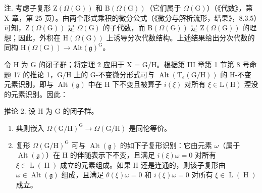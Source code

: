 注. 考虑子复形 \(\mathrm{Z}(\varOmega(\mathrm{G}))\) 和 \(\mathrm{B}(\varOmega(\mathrm{G}))\)（它们属于 \(\varOmega(\mathrm{G})\)）（《代数》，第 X 章，第 25 页）。由两个形式乘积的微分公式（《微分与解析流形，结果》，8.3.5）可知，\(\mathrm{Z}(\varOmega(\mathrm{G}))\) 是 \(\varOmega(\mathrm{G})\) 的子代数，而 \(\mathrm{B}(\varOmega(\mathrm{G}))\) 是 \(\mathrm{Z}(\varOmega(\mathrm{G}))\) 的理想；因此，外积在 \(\mathrm{H}(\varOmega(\mathrm{G}))\) 上诱导分次代数结构。上述结果给出分次代数的同构 \(\mathrm{H}(\varOmega(\mathrm{G})) \to \mathrm{Alt}(\mathfrak{g})^{\mathrm{G}}\)。

令 H 为 G 的闭子群；将定理 2 应用于 X = G/H。根据第 III 章第 1 节第 8 号命题 17 的推论 1，G/H 上的 G-不变微分形式可与 \(\operatorname{Alt}(\mathrm{T}_{e}(\mathrm{G}/\mathrm{H}))\) 的 H-不变元素识别，即与 \(\operatorname{Alt}(\mathfrak{g})\) 中在 H 下不变且被算子 \(i(\xi)\) 对所有 \(\xi \in \mathrm{L}(\mathrm{H})\) 湮没的元素识别。因此：

推论 2. 设 \(\mathrm{H}\) 为 \(\mathrm{G}\) 的闭子群。

\begin{enumerate}
\def\labelenumi{\alph{enumi})}
\item
  典则嵌入 \(\Omega (\mathrm{G / H})^{\mathrm{G}}\to \Omega (\mathrm{G / H})\) 是同伦等价。
\item
  复形 \(\Omega(\mathrm{G}/\mathrm{H})^{\mathrm{G}}\) 可与 \(\operatorname{Alt}(\mathfrak{g})\) 的如下子复形识别：它由元素 \(\omega\)（属于 \(\operatorname{Alt}(\mathfrak{g})\)）在 H 的伴随表示下不变，且满足 \(i(\xi)\omega = 0\) 对所有 \(\xi \in \operatorname{L}(\operatorname{H})\) 成立的元素组成。如果 H 还是连通的，则该子复形由 \(\omega \in \operatorname{Alt}(\mathfrak{g})\) 组成，且满足 \(\theta(\xi)\omega = 0\) 和 \(i(\xi)\omega = 0\) 对所有 \(\xi \in \operatorname{L}(\operatorname{H})\) 成立。
\end{enumerate}

